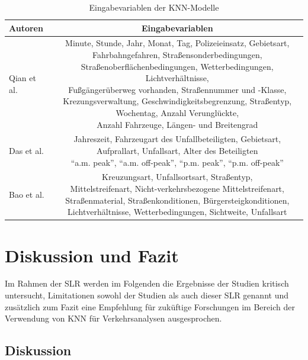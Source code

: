 \documentclass{scrartcl}
\begin{document}
\begin{table}[h!]
   \centering
   \label{tab2}
   \caption{Eingabevariablen der KNN-Modelle}
   \begin{tabular}{lc} \toprule
      Autoren & Eingabevariablen \\ \midrule
      Qian et al. & \makecell[r]{Minute, Stunde, Jahr, Monat, Tag, Polizeieinsatz, Gebietsart, \\ Fahrbahngefahren, Straßensonderbedingungen, \\ Straßenoberflächenbedingungen, Wetterbedingungen, Lichtverhältnisse, \\ Fußgängerüberweg vorhanden, Straßennummer und -Klasse, \\ Krezungsverwaltung, Geschwindigkeitsbegrenzung, Straßentyp, \\ Wochentag, Anzahl Verunglückte, \\ Anzahl Fahrzeuge, Längen- und Breitengrad} \\ \midrule
      Das et al. & \makecell[r]{Jahreszeit, Fahrzeugart des Unfallbeteiligten, Gebietsart, \\ Aufprallart, Unfallsart, Alter des Beteiligten \\ \enquote{a.m. peak}, \enquote{a.m. off-peak}, \enquote{p.m. peak}, \enquote{p.m. off-peak}} \\ \midrule
      Bao et al. & \makecell[r]{Kreuzungsart, Unfallsortsart, Straßentyp, \\ Mittelstreifenart, Nicht-verkehrsbezogene Mittelstreifenart, \\ Straßenmaterial, Straßenkonditionen, Bürgersteigkonditionen, \\ Lichtverhältnisse, Wetterbedingungen, Sichtweite, Unfallsart} \\ \bottomrule
   \end{tabular}
\end{table}

\section{Diskussion und Fazit}

Im Rahmen der SLR werden im Folgenden die Ergebnisse der Studien kritisch untersucht,
Limitationen sowohl der Studien als auch dieser SLR genannt und zusätzlich
zum Fazit eine Empfehlung für zuküftige Forschungen im Bereich der Verwendung
von KNN für Verkehrsanalysen ausgesprochen.

\subsection{Diskussion}
\end{document}
